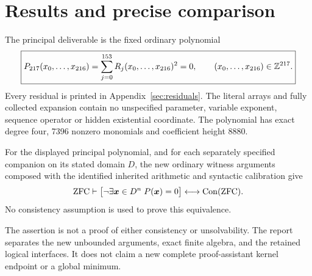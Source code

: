 \section{Results and precise comparison}
\label{sec:results}
The principal deliverable is the fixed ordinary polynomial
\begin{equation}\label{eq:principal}
 \boxed{P_{217}(x_0,\ldots,x_{216})
       =\sum_{j=0}^{153}R_j(x_0,\ldots,x_{216})^2=0,
       \qquad(x_0,\ldots,x_{216})\in\mathbb Z^{217}.}
\end{equation}
Every residual is printed in Appendix~\ref{sec:residuals}. The literal
arrays and fully collected expansion contain no unspecified parameter,
variable exponent, sequence operator or hidden existential coordinate.
The polynomial has exact degree four, 7396 nonzero monomials and
coefficient height 8880.

\begin{theorem}\label{thm:main}
For the displayed principal polynomial, and for each separately specified
companion on its stated domain $D$, the new ordinary witness arguments
composed with the identified inherited arithmetic and syntactic
calibration give
\[
 \mathrm{ZFC}\vdash
 \bigl[\neg\exists\boldsymbol x\in D^n\;P(\boldsymbol x)=0\bigr]
 \longleftrightarrow\operatorname{Con}(\mathrm{ZFC}).
\]
No consistency assumption is used to prove this equivalence.
\end{theorem}
The assertion is not a proof of either consistency or unsolvability.
The report separates the new unbounded arguments, exact finite algebra,
and the retained logical interfaces. It does not claim a new complete
proof-assistant kernel endpoint or a global minimum.

